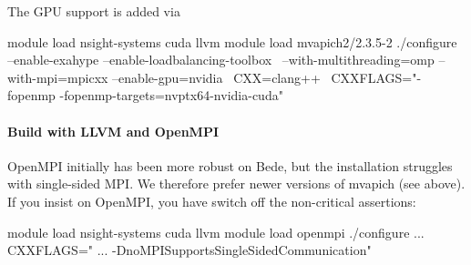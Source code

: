 \noindent
The GPU support is added via 
\begin{code}
module load nsight-systems cuda llvm
module load mvapich2/2.3.5-2 
./configure --enable-exahype --enable-loadbalancing-toolbox \
 --with-multithreading=omp  --with-mpi=mpicxx --enable-gpu=nvidia \
 CXX=clang++ \
 CXXFLAGS="-fopenmp -fopenmp-targets=nvptx64-nvidia-cuda"
\end{code}


 

  

\paragraph{Build with LLVM and OpenMPI}

OpenMPI initially has been more robust on Bede, but the installation struggles
with single-sided MPI. 
We therefore prefer newer versions of mvapich (see above).
If you insist on OpenMPI, you have switch off the non-critical assertions:

\begin{code}
module load nsight-systems cuda llvm
module load openmpi
./configure ... CXXFLAGS=" ... -DnoMPISupportsSingleSidedCommunication"
\end{code}





